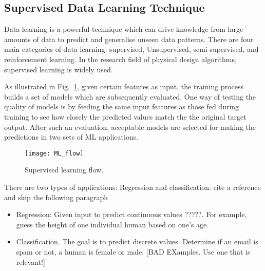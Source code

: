 \subsection{Supervised Data Learning Technique}
Data-learning is a powerful technique which can drive knowledge from large amounts of data to predict and generalise unseen data patterns. There are four main categories of data learning: supervised, Unsupervised, semi-supervised, and reinforcement learning. In the research field of physical design algorithms, supervised learning is widely used.

As illustrated in Fig.~\ref{fig:ml_flow}, given certain features as input, the training process builds a set of models which are subsequently evaluated. One way of testing the quality of models is by feeding the same input features as those fed during training to see how closely the predicted values match the the original target output. After such an evaluation, acceptable models are selected for making the predictions in two sets of ML applications. 
\begin{figure}[tb!]
    \centering
    \texttt{[image: ML\_flow]}
    \caption{Supervised learning flow.}
    \label{fig:ml_flow}
\end{figure}
There are two types of applications: Regression and classification. {cite a reference and skip the following paragraph} 
\begin{itemize}
\item Regression: Given input to predict continuous values ?????. For example, guess the height of one individual human based on one's age. 
\item Classification. The goal is to predict discrete values. Determine if an email is spam or not, a human is female or male. 
[BAD EXamples.  Use one that is relevant!]
\end{itemize}
